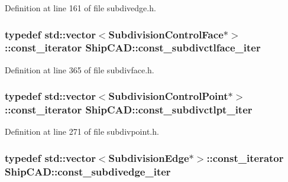 Definition at line 161 of file subdivedge.\+h.

\subsubsection[{\texorpdfstring{const\+\_\+subdivctlface\+\_\+iter}{const_subdivctlface_iter}}]{\setlength{\rightskip}{0pt plus 5cm}typedef std\+::vector$<${\bf Subdivision\+Control\+Face}$\ast$$>$\+::const\+\_\+iterator {\bf Ship\+C\+A\+D\+::const\+\_\+subdivctlface\+\_\+iter}}\hypertarget{namespaceShipCAD_a18309973422a59f794be8aa48b9048e8}{}\label{namespaceShipCAD_a18309973422a59f794be8aa48b9048e8}


Definition at line 365 of file subdivface.\+h.

\subsubsection[{\texorpdfstring{const\+\_\+subdivctlpt\+\_\+iter}{const_subdivctlpt_iter}}]{\setlength{\rightskip}{0pt plus 5cm}typedef std\+::vector$<${\bf Subdivision\+Control\+Point}$\ast$$>$\+::const\+\_\+iterator {\bf Ship\+C\+A\+D\+::const\+\_\+subdivctlpt\+\_\+iter}}\hypertarget{namespaceShipCAD_a8d30ac0ddba81aebfbe0589c7d25434e}{}\label{namespaceShipCAD_a8d30ac0ddba81aebfbe0589c7d25434e}


Definition at line 271 of file subdivpoint.\+h.

\subsubsection[{\texorpdfstring{const\+\_\+subdivedge\+\_\+iter}{const_subdivedge_iter}}]{\setlength{\rightskip}{0pt plus 5cm}typedef std\+::vector$<${\bf Subdivision\+Edge}$\ast$$>$\+::const\+\_\+iterator {\bf Ship\+C\+A\+D\+::const\+\_\+subdivedge\+\_\+iter}}\hypertarget{namespaceShipCAD_a42f420b898cf32478eeab87aa058e024}{}\label{namespaceShipCAD_a42f420b898cf32478eeab87aa058e024}


